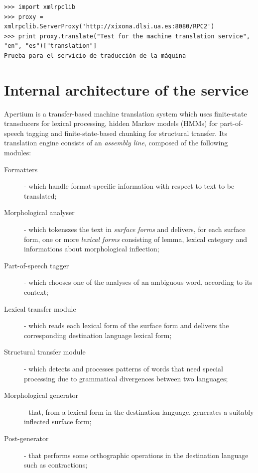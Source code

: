 \documentclass[11pt]{article}
\begin{document}
\begin{verbatim}
>>> import xmlrpclib
>>> proxy = xmlrpclib.ServerProxy('http://xixona.dlsi.ua.es:8080/RPC2')
>>> print proxy.translate("Test for the machine translation service", "en", "es")["translation"]
Prueba para el servicio de traducción de la máquina
\end{verbatim}


\section{Internal architecture of the service}

Apertium is a transfer-based machine translation system which uses finite-state transducers for lexical processing, hidden Markov models (HMMs) for part-of-speech tagging and finite-state-based chunking for structural transfer. Its translation engine consists of an \emph{assembly line}, composed of the following modules:

\begin{description}
 \item[Formatters] - which handle format-specific information with respect to text to be translated;
 \item[Morphological analyser] - which tokenszes the text in \emph{surface forms} and delivers, for each surface form, one or more \emph{lexical forms} consisting of lemma, lexical category and informations about morphological inflection;
 \item[Part-of-speech tagger] - which chooses one of the analyses of an ambiguous word, according to its context;
 \item[Lexical transfer module] - which reads each lexical form of the surface form and delivers the corresponding destination language lexical form;
 \item[Structural transfer module] - which detects and processes patterns of words that need special processing due to grammatical divergences between two languages;
 \item[Morphological generator] - that, from a lexical form in the destination language, generates a suitably inflected surface form;
 \item[Post-generator] - that performs some orthographic operations in the destination language such as contractions;
\end{description}

\end{document}
